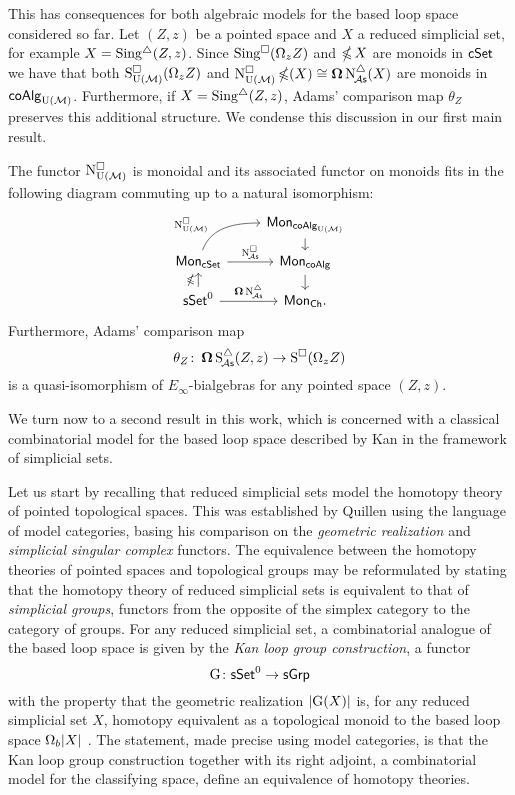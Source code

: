 This has consequences for both algebraic models for the based loop space considered so far.
Let $(Z,z)$ be a pointed space and $X$ a reduced simplicial set, for example $X = \operatorname{Sing^{\triangle}}(Z,z)$.
Since $\operatorname{Sing^{\square}}(\Omega_z Z)$ and $\operatorname{\mathbb{\Omega}} X$ are monoids in $\mathsf{cSet}$ we have that both $\operatorname{S^{\square}_{{\operatorname{U}(\mathcal{M})}}}(\Omega_z Z)$ and $\operatorname{N^{\square}_{{\operatorname{U}(\mathcal{M})}}} \operatorname{\mathbb{\Omega}}(X) \cong \operatorname{\mathbf{\Omega}} \operatorname{N^{\triangle}_{\!{\mathcal{A}\mathsf{s}}}}(X)$ are monoids in $\mathsf{coAlg}_{\operatorname{U}(\mathcal{M})}$.
Furthermore, if $X = \operatorname{Sing^{\triangle}}(Z,z)$, Adams' comparison map $\theta_Z$ preserves this additional structure.
We condense this discussion in our first main result.

\begin{theorem} \label{t:1st main thm in the intro}
	The functor $\operatorname{N^{\square}_{{\operatorname{U}(\mathcal{M})}}}$ is monoidal and its associated functor on monoids fits in the following diagram commuting up to a natural isomorphism:
	\[
	\begin{tikzcd} [row sep=small]
	& \Mon_{\coAlg_\UM} \arrow[d] \\
	\Mon_{\cSet} \arrow[ru, "\cchainsUM", out=70, in=180, near start] \arrow[r, "\cchainsA"]
	& \Mon_{\coAlg} \arrow[d] \\
	\sSet^0 \arrow[r, "\cobar \schainsA"] \arrow[u, "\ccobar"]
	& \Mon_{\Ch}.
	\end{tikzcd}
	\]
Furthermore, Adams' comparison map
\[
\theta_Z \colon \operatorname{\mathbf{\Omega}} \operatorname{S^{\triangle}_{\!{\mathcal{A}\mathsf{s}}}}(Z,z) \to \operatorname{S^{\square}}(\Omega_z Z)
\]
is a quasi-isomorphism of $E_{\infty}$-bialgebras for any pointed space $(Z,z)$.
\end{theorem}

We turn now to a second result in this work, which is concerned with a classical combinatorial model for the based loop space described by Kan in the framework of simplicial sets.

Let us start by recalling that reduced simplicial sets model the homotopy theory of pointed topological spaces.
This was established by Quillen using the language of model categories, basing his comparison on the \textit{geometric realization} and \textit{simplicial singular complex} functors.
The equivalence between the homotopy theories of pointed spaces and topological groups may be reformulated by stating that the homotopy theory of reduced simplicial sets is equivalent to that of \textit{simplicial groups}, functors from the opposite of the simplex category to the category of groups.
For any reduced simplicial set, a combinatorial analogue of the based loop space is given by the \textit{Kan loop group construction}, a functor
\[
\operatorname{G} \colon \mathsf{sSet}^0 \to \mathsf{sGrp}
\]
with the property that the geometric realization $\lvert\operatorname{G}(X)\rvert$ is, for any reduced simplicial set $X$, homotopy equivalent as a topological monoid to the based loop space $\Omega_b \lvert X\rvert$ \cite{berger1995loops}.
The statement, made precise using model categories, is that the Kan loop group construction together with its right adjoint, a combinatorial model for the classifying space, define an equivalence of homotopy theories.

